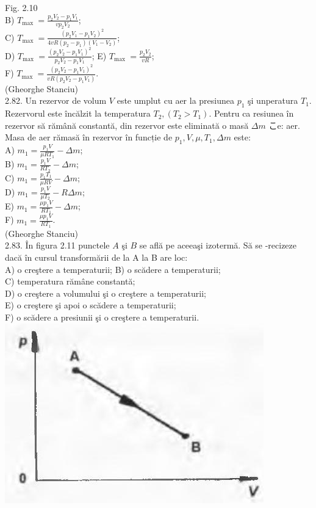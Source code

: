 \documentclass[10pt]{article}
\begin{document}
Fig. 2.10\\
B) $T_{\text {max }}=\frac{p_{2} V_{2}-p_{1} V_{1}}{v p_{2} V_{2}}$;\\
C) $T_{\text {max }}=\frac{\left(p_{2} V_{1}-p_{1} V_{2}\right)^{2}}{4 v R\left(p_{2}-p_{1}\right)\left(V_{1}-V_{2}\right)}$;\\
D) $T_{\text {max }}=\frac{\left(p_{2} V_{2}-p_{1} V_{1}\right)^{2}}{p_{2} V_{2}-p_{1} V_{1}}$; E) $T_{\text {max }}=\frac{p_{2} V_{2}}{v R}$;\\
F) $T_{\text {max }}=\frac{\left(p_{2} V_{2}-p_{1} V_{1}\right)^{2}}{v R\left(p_{2} V_{2}-p_{1} V_{1}\right)}$.\\
(Gheorghe Stanciu)\\
2.82. Un rezervor de volum $V$ este umplut cu aer la presiunea $p_{1}$ şi unperatura $T_{1}$. Rezervorul este încălzit la temperatura $T_{2},\left(T_{2}>T_{1}\right)$. Pentru ca resiunea în rezervor să rămână constantă, din rezervor este eliminată o masă $\Delta m$ こe: aer. Masa de aer rămasă în rezervor în funcție de $p_{1}, V, \mu, T_{1}, \Delta m$ este:\\
A) $m_{1}=\frac{p_{1} V}{\mu R T_{1}}-\Delta m$;\\
B) $m_{1}=\frac{p_{1} V}{R T_{2}}-\Delta m$;\\
C) $m_{1}=\frac{p_{1} T_{1}}{\mu R V}-\Delta m$;\\
D) $m_{1}=\frac{p_{1} V}{\mu T_{2}}-R \Delta m$;\\
E) $m_{1}=\frac{\mu p_{1} V}{R T_{1}}-\Delta m$;\\
F) $m_{1}=\frac{\mu p_{1} V}{R T_{1}}$.\\
(Gheorghe Stanciu)\\
2.83. În figura 2.11 punctele $A$ şi $B$ se află pe aceeaşi izotermă. Să se -recizeze dacă în cursul transformării de la A la B are loc:\\
A) o creştere a temperaturii; B) o scădere a temperaturii;\\
C) temperatura rămâne constantă;\\
D) o creştere a volumului şi o creştere a temperaturii;\\
E) o creştere şi apoi o scădere a temperaturii;\\
F) o scădere a presiunii şi o creştere a temperaturii.\\
\includegraphics[max width=\textwidth, center]{2025_07_01_5b3ff9fa0d508c8e9f17g-092}
\end{document}
